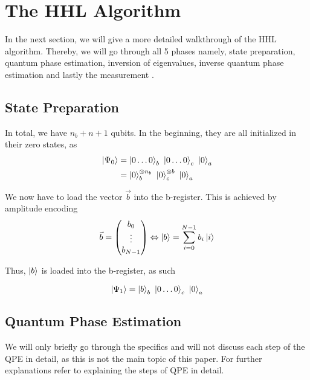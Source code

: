 \section{The HHL Algorithm}
In the next section, we will give a more detailed walkthrough of the HHL algorithm.
Thereby, we will go through all 5 phases namely, state preparation, quantum phase estimation, inversion of eigenvalues, inverse quantum phase estimation and lastly the measurement \cite{step_by_step}.

\subsection{State Preparation}

In total, we have $n_b + n + 1$ qubits. 
In the beginning, they are all initialized in their zero states, as
\begin{equation}
\begin{split}
\ket{\Psi_0} &= \ket{0\dots0}_b\ \ket{0\dots0}_c\ \ket{0}_a \\
&= \ket{0}_b^{{\otimes n_b}}\ \ket{0}_c^{\otimes b}\ \ket{0}_a 
\end{split}
\end{equation}

We now have to load the vector $\vec{b}$ into the b-register. 
This is achieved by amplitude encoding
\begin{equation}
    \vec{b} = \begin{pmatrix} b_0\\ \vdots \\ b_{N-1} \end{pmatrix} 
    \Leftrightarrow  
     \ket b = \sum_{i=0}^{N-1} b_i \ket i
\end{equation}

Thus, $\ket b$ is loaded into the b-register, as such

\begin{equation}
\ket{\Psi_1} = \ket{b}_b\ \ket{0\dots0}_c\ \ket{0}_a
\end{equation}

\subsection{Quantum Phase Estimation}
We will only briefly go through the specifics  and will not discuss each step of the QPE in detail, as this is not the main topic of this paper. 
For further explanations refer to \cite{step_by_step} explaining the steps of QPE in detail.

